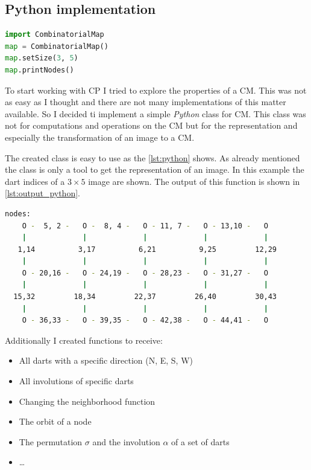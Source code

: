 \documentclass[12pt]{article}
\begin{document}

\subsection{Python implementation} %
\label{sub:python_implementation}

\begin{lstlisting}[caption={how to use the created \texttt{Python} class},label={lst:python},language=Python]
import CombinatorialMap
map = CombinatorialMap()
map.setSize(3, 5)
map.printNodes()
\end{lstlisting}

To start working with CP I tried to explore the properties of a CM\@. This was not as easy as I thought and there are not many implementations of this matter available. So I decided ti implement a simple \emph{Python} class for CM\@.
This class was not for computations and operations on the CM but for the representation and especially the transformation of an image to a CM\@.
\par
The created class is easy to use as the \cref{lst:python} shows. As already mentioned the class is only a tool to get the representation of an image. In this example the dart indices of a \( 3 \times 5 \) image are shown. The output of this function is shown in \cref{lst:output_python}.

\begin{lstlisting}[caption={The output of the commands of \cref{lst:python}},label={lst:output_python},language=bash,float,floatplacement=H,basicstyle=\scriptsize]
nodes:
    O -  5, 2 -   O -  8, 4 -   O - 11, 7 -   O - 13,10 -   O
    |             |             |             |             |
   1,14          3,17          6,21          9,25         12,29
    |             |             |             |             |
    O - 20,16 -   O - 24,19 -   O - 28,23 -   O - 31,27 -   O
    |             |             |             |             |
  15,32         18,34         22,37         26,40         30,43
    |             |             |             |             |
    O - 36,33 -   O - 39,35 -   O - 42,38 -   O - 44,41 -   O
\end{lstlisting}

Additionally I created functions to receive:
\begin{itemize}
  \item All darts with a specific direction (N, E, S, W)
  \item All involutions of specific darts
  \item Changing the neighborhood function
  \item The orbit of a node
  \item The permutation \( \sigma \) and the involution \( \alpha \) of a set of darts
  \item \ldots
\end{itemize}
\end{document}
